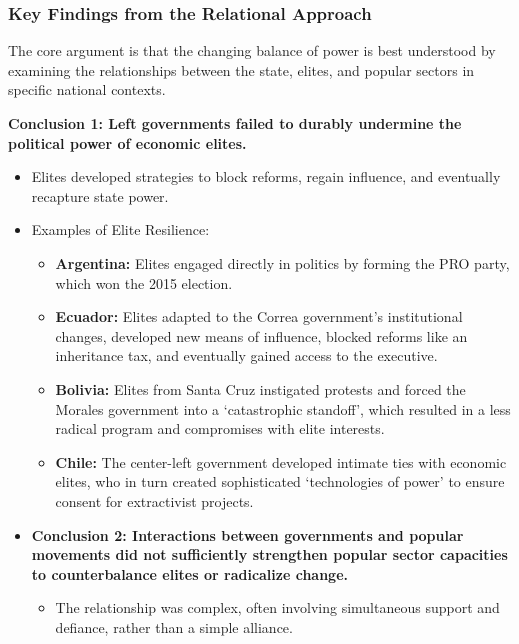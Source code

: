 \documentclass{article}
\begin{document}
    \subsubsection{Key Findings from the Relational Approach}

    \noindent The core argument is that the changing balance of power is
best understood by examining the relationships between the state, elites,
and popular sectors in specific national contexts.

    \noindent
\textbf{Conclusion 1: Left governments failed to durably undermine the political power of economic elites.}
    \begin{itemize}
        \item Elites developed strategies to block reforms, regain
        influence, and eventually recapture state power.
        \item Examples of Elite Resilience:
        \begin{itemize}
            \item \textbf{Argentina:} Elites engaged directly in politics by
            forming the PRO party, which won the 2015 election.
            \item \textbf{Ecuador:} Elites adapted to the Correa
            government's institutional changes, developed new means of
            influence, blocked reforms like an inheritance tax, and
            eventually gained access to the executive.
            \item \textbf{Bolivia:} Elites from Santa Cruz instigated
            protests and forced the Morales government into a `catastrophic
            standoff', which resulted in a less radical program and
            compromises with elite interests.
            \item \textbf{Chile:} The center-left government developed
            intimate ties with economic elites, who in turn created
            sophisticated `technologies of power' to ensure consent for
            extractivist projects.
        \end{itemize}
        \item
        \textbf{Conclusion 2: Interactions between governments and popular movements did not sufficiently strengthen popular sector capacities to counterbalance elites or radicalize change.}
        \begin{itemize}
            \item The relationship was complex, often involving simultaneous
            support and defiance, rather than a simple alliance.

\end{itemize}
\end{itemize}
\end{document}
